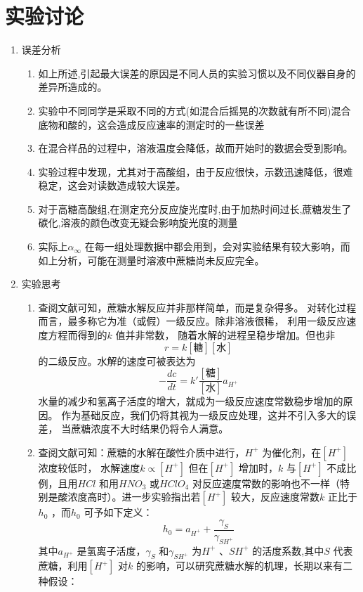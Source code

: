 \documentclass[11pt]{report}
\begin{document}
\section{实验讨论}
\label{sec:org8537467}
\begin{enumerate}
\item 误差分析
\label{sec:org9f7058b}
\begin{enumerate}
\item 如上所述,引起最大误差的原因是不同人员的实验习惯以及不同仪器自身的差异所造成的。
\item 实验中不同同学是采取不同的方式(如混合后摇晃的次数就有所不同)混合底物和酸的，这会造成反应速率的测定时的一些误差
\item 在混合样品的过程中，溶液温度会降低，故而开始时的数据会受到影响。
\item 实验过程中发现，尤其对于高酸组，由于反应很快，示数迅速降低，很难稳定，这会对读数造成较大误差。
\item 对于高糖高酸组,在测定充分反应旋光度时,由于加热时间过长,蔗糖发生了碳化,溶液的颜色改变无疑会影响旋光度的测量
\item 实际上\(\alpha_{\infty}\) 在每一组处理数据中都会用到，会对实验结果有较大影响，而如上分析，可能在测量时溶液中蔗糖尚未反应完全。
\end{enumerate}
\item 实验思考
\label{sec:orgb49090e}
\begin{enumerate}
\item 查阅文献可知，蔗糖水解反应并非那样简单，而是复杂得多。
对转化过程而言，最多称它为准（或假）一级反应。除非溶液很稀，
利用一级反应速度方程而得到的\(k\) 值并非常数，
随着水解的进程呈稳步增加。但也非
\[
	r=k[糖][水]
	\]
的二级反应。水解的速度可被表达为
\[
	-\frac{dc}{dt}=k'\frac{[糖]}{[水]}a_{H^{+}}
	\]
水量的减少和氢离子活度的增大，就成为一级反应速度常数稳步增加的原因。
作为基础反应，我们仍将其视为一级反应处理，这并不引入多大的误差，
当蔗糖浓度不大时结果仍将令人满意。
\item 查阅文献可知：蔗糖的水解在酸性介质中进行，\(H^{+}\) 为催化剂，在\([H^{+}]\) 浓度较低时，
水解速度\(k\propto [H^{+}]\) 但在\([H^{+}]\) 增加时，\(k\) 与\([H^{+}]\) 不成比例，且用\(HCl\) 和用\(HNO_{3}\) 或\(HClO_{4}\) 对反应速度常数的影响也不一样（特别是酸浓度高时）。进一步实验指出若\([H^{+}]\) 较大，反应速度常数\(k\) 正比于\(h_{0}\) ，而\(h_{0}\) 可予如下定义：
\[
	h_{0}=a_{H^{+}}+\frac{\gamma_{S}}{\gamma_{SH^{+}}}
	\]
其中\(a_{H^{+}}\) 是氢离子活度，\(\gamma_{S}\) 和\(\gamma_{SH^{+}}\) 为\(H^{+}\) 、\(SH^{+}\) 的活度系数,其中\(S\) 代表蔗糖，利用\([H^{+}]\) 对\(k\) 的影响，可以研究蔗糖水解的机理，长期以来有二种假设：

\end{enumerate}
\end{enumerate}
\end{document}
